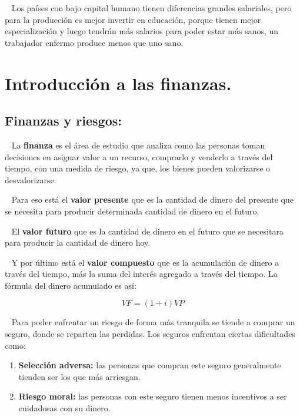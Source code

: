 \documentclass[
  letterpaper,
  DIV=11,
  numbers=noendperiod]{scrreport}
\begin{document}
~ Los países con bajo capital humano tienen diferencias grandes
salariales, pero para la producción es mejor invertir en educación,
porque tienen mejor especialización y luego tendrán más salarios para
poder estar más sanos, un trabajador enfermo produce menos que uno sano.


\hypertarget{introducciuxf3n-a-las-finanzas.}{%
\chapter{Introducción a las
finanzas.}\label{introducciuxf3n-a-las-finanzas.}}

\hypertarget{finanzas-y-riesgos}{%
\section{Finanzas y riesgos:}\label{finanzas-y-riesgos}}

~ La \textbf{finanza} es el área de estudio que analiza como las
personas toman decisiones en asignar valor a un recurso, comprarlo y
venderlo a través del tiempo, con una medida de riesgo, ya que, los
bienes pueden valorizarse o desvalorizarse.

~ Para eso está el \textbf{valor presente} que es la cantidad de dinero
del presente que se necesita para producir determinada cantidad de
dinero en el futuro.

~ El \textbf{valor futuro} que es la cantidad de dinero en el futuro que
se necesitara para producir la cantidad de dinero hoy.

~ Y por último está el \textbf{valor compuesto} que es la acumulación de
dinero a través del tiempo, más la suma del interés agregado a través
del tiempo. La fórmula del dinero acumulado es así:

\[
VF=\left(1+i\right)VP
\]

~ Para poder enfrentar un riesgo de forma más tranquila se tiende a
comprar un seguro, donde se reparten las perdidas. Los seguros enfrentan
ciertas dificultades como:

\begin{enumerate}
\def\labelenumi{\arabic{enumi})}
\item
  \textbf{Selección adversa:} las personas que compran este seguro
  generalmente tienden ser los que más arriesgan.
\item
  \textbf{Riesgo moral:} las personas con este seguro tienen menos
  incentivos a ser cuidadosas con su dinero.
\end{enumerate}
\end{document}

